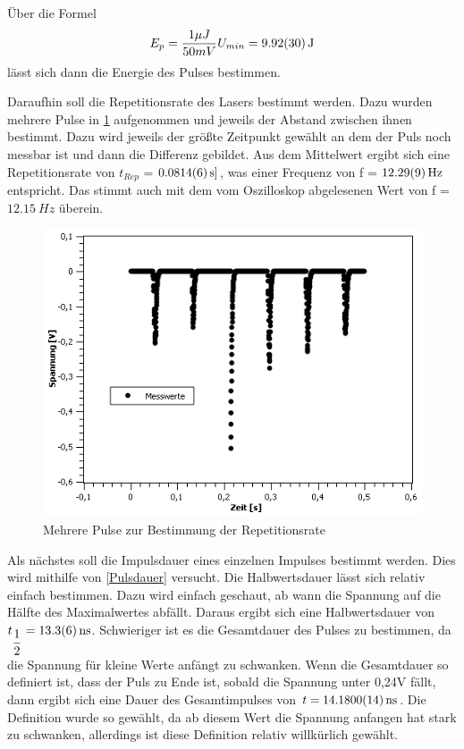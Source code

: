 \documentclass[
	a4paper,
	12pt,
	pagesize,
	ngerman
]{scrartcl}
\begin{document}
Über die Formel
\begin{equation}
E_{p} = \dfrac{1 \mu J}{50mV}U_{min} = \SI{9,92 \pm 0,30}{J}
\end{equation}
lässt sich dann die Energie des Pulses bestimmen.

Daraufhin soll die Repetitionsrate des Lasers bestimmt werden. Dazu wurden mehrere Pulse in \cref{Rep} aufgenommen und jeweils der Abstand zwischen ihnen bestimmt. Dazu wird jeweils der größte Zeitpunkt gewählt an dem der Puls noch messbar ist und dann die Differenz gebildet. Aus dem Mittelwert ergibt sich eine Repetitionsrate von $t_{Rep}$ = $\SI{0,0814 \pm 0,0006}{s]}$, was einer Frequenz von f = $\SI{12,29 \pm 0,09}{Hz}$ entspricht. Das stimmt auch mit dem vom Oszilloskop abgelesenen Wert von f = $\SI{12,15}{Hz}$ überein.

\begin{figure}[h!]
	\centering
	\includegraphics[scale=0.7]{Rep.png}
	\caption{Mehrere Pulse zur Bestimmung der Repetitionsrate}
	\label{Rep}
\end{figure}


Als nächstes soll die Impulsdauer eines einzelnen Impulses bestimmt werden. Dies wird mithilfe von \cref{Pulsdauer} versucht. Die Halbwertsdauer lässt sich relativ einfach bestimmen. Dazu wird einfach geschaut, ab wann die Spannung auf die Hälfte des Maximalwertes abfällt. Daraus ergibt sich eine Halbwertsdauer von $t_{\dfrac{1}{2}} = \SI{13,3 \pm 0,6}{ns}$. Schwieriger ist es die Gesamtdauer des Pulses zu bestimmen, da die Spannung für kleine Werte anfängt zu schwanken. Wenn die Gesamtdauer so definiert ist, dass der Puls zu Ende ist, sobald die Spannung unter 0,24V fällt, dann ergibt sich eine Dauer des Gesamtimpulses von $t = \SI{14,180 \pm 0,0014}{ns}$. Die Definition wurde so gewählt, da ab diesem Wert die Spannung anfangen hat stark zu schwanken, allerdings ist diese Definition relativ willkürlich gewählt. 
\end{document}

